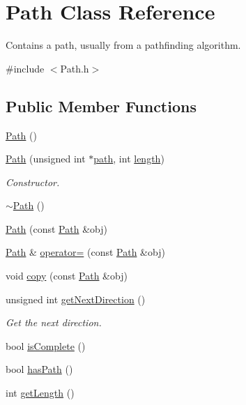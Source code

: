 \hypertarget{classPath}{\section{Path Class Reference}
\label{classPath}
}


Contains a path, usually from a pathfinding algorithm.  




{\ttfamily \#include $<$Path.\-h$>$}

\subsection*{Public Member Functions}
\begin{DoxyCompactItemize}
\item 
\hyperlink{classPath_af26cfab021ddf49af73da3b2beca85ac}{Path} ()
\item 
\hyperlink{classPath_ab3bdc2d36faec392cee7036599cac1e8}{Path} (unsigned int $\ast$\hyperlink{classPath_a15e858fcafd08883c9aa4460e9a63961}{path}, int \hyperlink{classPath_a899a5337cfcdac6fb6ff020dd7b4cf7d}{length})
\begin{DoxyCompactList}\small\item\em Constructor. \end{DoxyCompactList}\item 
\hyperlink{classPath_a141da9ff89c85e0ba410b5a73864c267}{$\sim$\-Path} ()
\item 
\hyperlink{classPath_a7e773507a877600083364271852ed19f}{Path} (const \hyperlink{classPath}{Path} \&obj)
\item 
\hyperlink{classPath}{Path} \& \hyperlink{classPath_a8fed62e1c09866defe99985648111462}{operator=} (const \hyperlink{classPath}{Path} \&obj)
\item 
void \hyperlink{classPath_ab9976c0fbf9ef118d8fb321aa904afbc}{copy} (const \hyperlink{classPath}{Path} \&obj)
\item 
unsigned int \hyperlink{classPath_a03ca062f08b780af43c39e27f02425c9}{get\-Next\-Direction} ()
\begin{DoxyCompactList}\small\item\em Get the next direction. \end{DoxyCompactList}\item 
bool \hyperlink{classPath_a025d58fe0a4ba7e2e525ac39f2e42d48}{is\-Complete} ()
\item 
bool \hyperlink{classPath_ab164e32a921ddff93de3206fbc9223ab}{has\-Path} ()
\item 
int \hyperlink{classPath_adf15aa16c75bdf6a02b9a52af0264a54}{get\-Length} ()
\end{DoxyCompactItemize}
